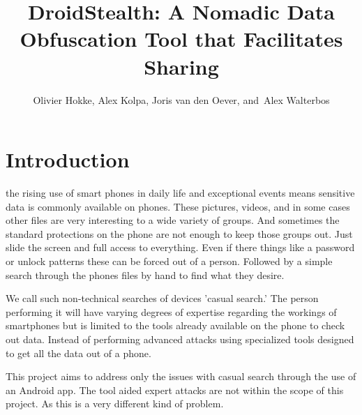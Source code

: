 \documentclass[twocolumn,english,compsoc,journal]{IEEEtran}
\begin{document}
\title{DroidStealth: A Nomadic Data Obfuscation Tool that Facilitates Sharing}


\author{Olivier Hokke, Alex Kolpa, Joris van den Oever, and~Alex Walterbos}




\maketitle

\IEEEdisplaynontitleabstractindextext{}


\IEEEpeerreviewmaketitle{}


\section{Introduction}

 the rising use of smart phones in daily life and
exceptional events means sensitive data is commonly available on phones.
These pictures, videos, and in some cases other files are very interesting
to a wide variety of groups. And sometimes the standard protections on
the phone are not enough to keep those groups out. Just slide the screen
and full access to everything. Even if there things like a password or
unlock patterns these can be forced out of a person. Followed by a simple
search through the phones files by hand to find what they desire.

We call such non-technical searches of devices 'casual search.' The
person performing it will have varying degrees of expertise regarding
the workings of smartphones but is limited to the tools already available
on the phone to check out data. Instead of performing advanced attacks
using specialized tools designed to get all the data out of a phone.

This project aims to address only the issues with casual search through
the use of an Android app. The tool aided expert attacks are not within the
scope of this project. As this is a very different kind of problem.
\end{document}
